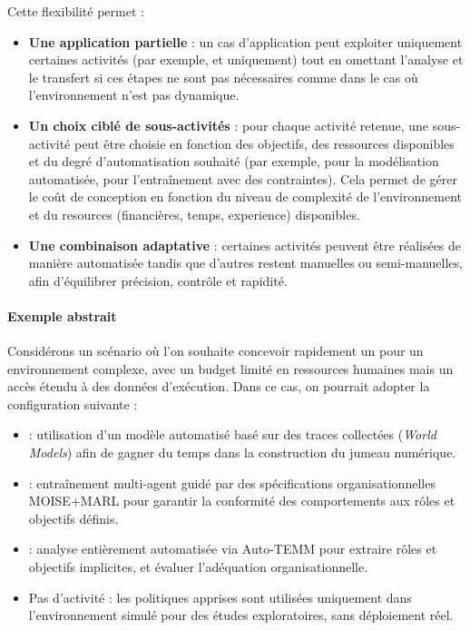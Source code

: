 Cette flexibilité permet :
\begin{itemize}
  \item \textbf{Une application partielle} : un cas d'application peut exploiter uniquement certaines activités (par exemple,  et  uniquement) tout en omettant l'analyse et le transfert si ces étapes ne sont pas nécessaires comme dans le cas où l'environnement n'est pas dynamique.
  \item \textbf{Un choix ciblé de sous-activités} : pour chaque activité retenue, une sous-activité peut être choisie en fonction des objectifs, des ressources disponibles et du degré d'automatisation souhaité (par exemple,  pour la modélisation automatisée,  pour l'entraînement avec des contraintes). Cela permet de gérer le coût de conception en fonction du niveau de complexité de l'environnement et du resources (financières, temps, experience) disponibles.
  \item \textbf{Une combinaison adaptative} : certaines activités peuvent être réalisées de manière automatisée tandis que d'autres restent manuelles ou semi-manuelles, afin d'équilibrer précision, contrôle et rapidité.
\end{itemize}

\paragraph{Exemple abstrait}
Considérons un scénario où l'on souhaite concevoir rapidement un  pour un environnement complexe, avec un budget limité en ressources humaines mais un accès étendu à des données d'exécution.
Dans ce cas, on pourrait adopter la configuration suivante :
\begin{itemize}
  \item {} : utilisation d'un modèle automatisé basé sur des traces collectées (\textit{World Models}) afin de gagner du temps dans la construction du jumeau numérique.
  \item {} : entraînement multi-agent guidé par des spécifications organisationnelles MOISE+MARL pour garantir la conformité des comportements aux rôles et objectifs définis.
  \item {} : analyse entièrement automatisée via Auto-TEMM pour extraire rôles et objectifs implicites, et évaluer l'adéquation organisationnelle.
  \item Pas d'activité  : les politiques apprises sont utilisées uniquement dans l'environnement simulé pour des études exploratoires, sans déploiement réel.
\end{itemize}

